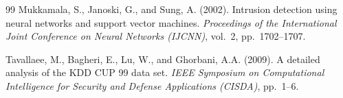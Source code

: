 \documentclass[12pt, letterpaper, oneside]{report}
\begin{document}
\begin{thebibliography}{99}
Mukkamala, S., Janoski, G., and Sung, A. (2002).
Intrusion detection using neural networks and support vector machines.
\textit{Proceedings of the International Joint Conference on Neural Networks (IJCNN)}, vol.\ 2, pp.\ 1702--1707.

Tavallaee, M., Bagheri, E., Lu, W., and Ghorbani, A.A. (2009).
A detailed analysis of the KDD CUP 99 data set.
\textit{IEEE Symposium on Computational Intelligence for Security and Defense Applications (CISDA)}, pp.\ 1--6.

\end{thebibliography}


\end{document}
